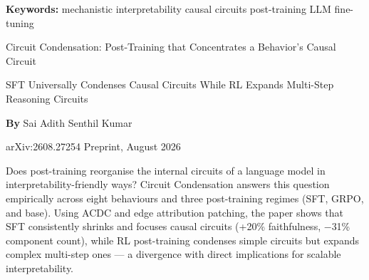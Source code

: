 \documentclass[10pt,twocolumn]{article}
\begin{document}
\setlength{\parindent}{0pt}
\setlength{\parskip}{4pt}

{\small\color{keywordgray}\textbf{Keywords:}
  mechanistic interpretability \textbullet{}
  causal circuits \textbullet{}
  post-training \textbullet{}
  LLM fine-tuning}\par\vspace{4pt}

{\LARGE\bfseries\raggedright
  Circuit Condensation: Post-Training that
  Concentrates a Behavior's Causal Circuit}\par\vspace{4pt}

{\large\itshape\raggedright
  SFT Universally Condenses Causal Circuits While RL
  Expands Multi-Step Reasoning Circuits}\par\vspace{6pt}

{\small\textbf{By} Sai Adith Senthil Kumar}\par\vspace{2pt}

{\small\color{keywordgray}arXiv:2608.27254 \textbullet{} Preprint, August 2026}
\par\vspace{2pt}\noindent{\color{rulered}\rule{\columnwidth}{0.6pt}}\vspace{6pt}

Does post-training reorganise the internal circuits of a language
model in interpretability-friendly ways? Circuit Condensation answers
this question empirically across eight behaviours and three post-training
regimes (SFT, GRPO, and base). Using ACDC and edge attribution patching,
the paper shows that SFT consistently shrinks and focuses causal circuits
(+20\% faithfulness, $-$31\% component count), while RL post-training
condenses simple circuits but expands complex multi-step ones — a
divergence with direct implications for scalable interpretability.
\end{document}
